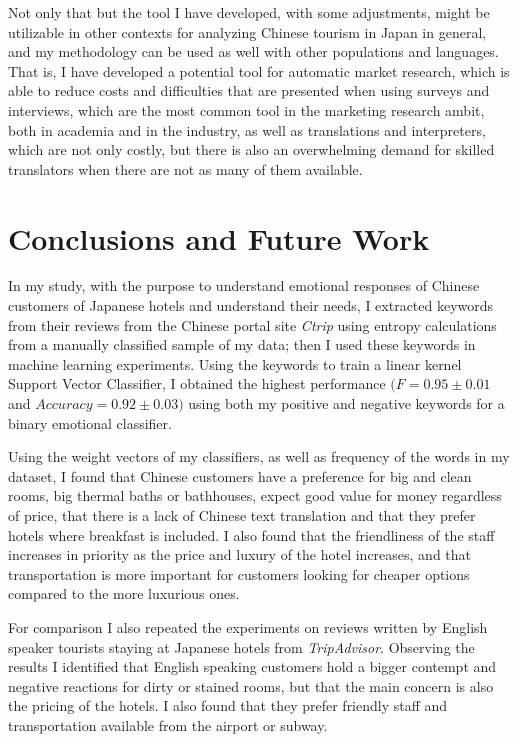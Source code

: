 \documentclass[review]{elsarticle}
\begin{document}
Not only that but the tool I have developed, with some adjustments, might be utilizable in other contexts for analyzing Chinese tourism in Japan in general, and my methodology can be used as well with other populations and languages. That is, I have developed a potential tool for automatic market research, which is able to reduce costs and difficulties that are presented when using surveys and interviews, which are the most common tool in the marketing research ambit, both in academia and in the industry, as well as translations and interpreters, which are not only costly, but there is also an overwhelming demand for skilled translators when there are not as many of them available.

\section{Conclusions and Future Work}\label{conclusions}

In my study, with the purpose to understand emotional responses of Chinese customers of Japanese hotels and understand their needs, I extracted keywords from their reviews from the Chinese portal site \textit{Ctrip} using entropy calculations from a manually classified sample of my data; then I used these keywords in machine learning experiments. Using the keywords to train a linear kernel Support Vector Classifier, I obtained the highest performance \((F=0.95\pm0.01\) and \(Accuracy = 0.92\pm0.03)\) using both my positive and negative keywords for a binary emotional classifier.

Using the weight vectors of my classifiers, as well as frequency of the words in my dataset, I found that Chinese customers have a preference for big and clean rooms, big thermal baths or bathhouses, expect good value for money regardless of price, that there is a lack of Chinese text translation and that they prefer hotels where breakfast is included. I also found that the friendliness of the staff increases in priority as the price and luxury of the hotel increases, and that transportation is more important for customers looking for cheaper options compared to the more luxurious ones.

For comparison I also repeated the experiments on reviews written by English speaker tourists staying at Japanese hotels from \textit{TripAdvisor}. Observing the results I identified that English speaking customers hold a bigger contempt and negative reactions for dirty or stained rooms, but that the main concern is also the pricing of the hotels. I also found that they prefer friendly staff and transportation available from the airport or subway.
\end{document}
